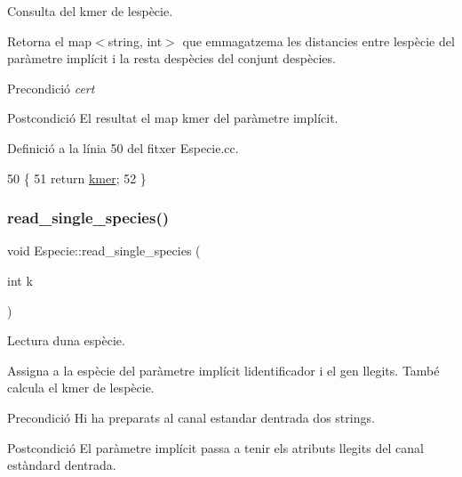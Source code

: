 Consulta del kmer de l\textquotesingle{}espècie. 

Retorna el map$<$string, int$>$ que emmagatzema les distancies entre l\textquotesingle{}espècie del paràmetre implícit i la resta d\textquotesingle{}espècies del conjunt d\textquotesingle{}espècies.

\begin{DoxyPrecond}{Precondició}
{\itshape cert} 
\end{DoxyPrecond}
\begin{DoxyPostcond}{Postcondició}
El resultat el map kmer del paràmetre implícit. 
\end{DoxyPostcond}


Definició a la línia 50 del fitxer Especie.\+cc.


\begin{DoxyCode}
50                                      \{
51     \textcolor{keywordflow}{return} \hyperlink{class_especie_aa438e3e2f785d96c0ac51e83f60a5879}{kmer};
52 \}
\end{DoxyCode}
\mbox{\label{class_especie_a1a60c5306ae621527bb9183a5c64583f}} 
\subsubsection{\texorpdfstring{read\+\_\+single\+\_\+species()}{read\_single\_species()}}
{\footnotesize\ttfamily void Especie\+::read\+\_\+single\+\_\+species (\begin{DoxyParamCaption}\item[{int}]{k }\end{DoxyParamCaption})}



Lectura d\textquotesingle{}una espècie. 

Assigna a la espècie del paràmetre implícit l\textquotesingle{}identificador i el gen llegits. També calcula el kmer de l\textquotesingle{}espècie.

\begin{DoxyPrecond}{Precondició}
Hi ha preparats al canal estandar d\textquotesingle{}entrada dos strings. 
\end{DoxyPrecond}
\begin{DoxyPostcond}{Postcondició}
El paràmetre implícit passa a tenir els atributs llegits del canal estàndard d\textquotesingle{}entrada. 
\end{DoxyPostcond}


